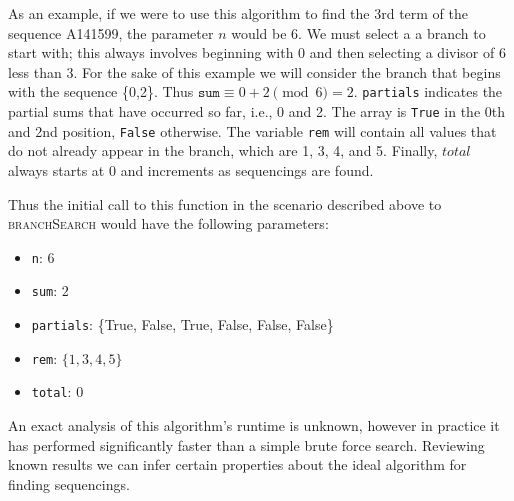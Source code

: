 \documentclass[12pt]{article}
\theoremstyle{plain}
\theoremstyle{definition}
\theoremstyle{remark}
\begin{document}
As an example, if we were to use this algorithm to find the 3rd term of the sequence A141599, the parameter $n$ would be 6. We must select a a branch to start with; this always involves beginning with 0 and then selecting a divisor of $6$ less than $3$. For the sake of this example we will consider the branch that begins with the sequence \{0,2\}. Thus $\texttt{sum} \equiv 0+2 \pmod6 = 2$. \texttt{partials} indicates the partial sums that have occurred so far, i.e., 0 and 2. The array is \texttt{True} in the 0th and 2nd position, \texttt{False} otherwise. The variable \texttt{rem} will contain all values that do not already appear in the branch, which are 1, 3, 4, and 5. Finally, $total$ always starts at 0 and increments as sequencings are found.

Thus the initial call to this function in the scenario described above to 
\textsc{branchSearch} would have the following parameters:
\begin{itemize}
\item \texttt{n}: $6$
\item \texttt{sum}: $2$
\item \texttt{partials}: \{True, False, True, False, False, False\}
\item \texttt{rem}: $\{1,3,4,5\}$
\item \texttt{total}: $0$
\end{itemize}

An exact analysis of this algorithm's runtime is unknown, however in practice it has performed significantly faster than a simple brute force search.  Reviewing known results we can infer certain properties about the ideal algorithm for finding sequencings.
\end{document}
